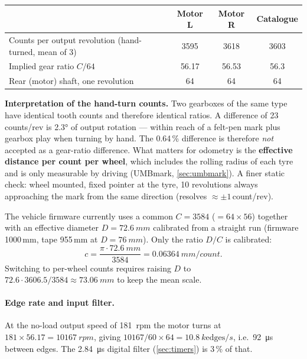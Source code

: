 \documentclass[11pt,a4paper]{article}
\begin{document}
\begin{center}
\small
\begin{tabular}{@{}lccc@{}}
\toprule
& \textbf{Motor L} & \textbf{Motor R} & \textbf{Catalogue}\\
\midrule
Counts per output revolution (hand-turned, mean of 3) & 3595 & 3618 & 3603\\
Implied gear ratio $C/64$ & 56.17 & 56.53 & 56.3\\
Rear (motor) shaft, one revolution & 64 & 64 & 64\\
\bottomrule
\end{tabular}
\end{center}

\begin{warnbox}
\textbf{Interpretation of the hand-turn counts.} Two gearboxes of the same type
have identical tooth counts and therefore identical ratios. A difference of
23\,counts/rev is \ang{2.3} of output rotation --- within reach of a felt-pen
mark plus gearbox play when turning by hand. The 0.64\,\% difference is
therefore \emph{not} accepted as a gear-ratio difference. What matters for
odometry is the \textbf{effective distance per count per wheel}, which includes
the rolling radius of each tyre and is only measurable by driving
(UMBmark, \cref{sec:umbmark}). A finer static check: wheel mounted, fixed pointer
at the tyre, 10 revolutions always approaching the mark from the same direction
(resolves $\approx\pm1$\,count/rev).
\end{warnbox}

The vehicle firmware currently uses a common $C=3584$ ($=64\times56$) together
with an effective diameter $D=\qty{72.6}{mm}$ calibrated from a straight run
(firmware 1000\,mm, tape 955\,mm at $D=\qty{76}{mm}$). Only the ratio $D/C$ is
calibrated:
\begin{equation}
c=\frac{\pi\cdot\qty{72.6}{mm}}{3584}=\qty{0.06364}{mm/count}.
\end{equation}
Switching to per-wheel counts requires raising $D$ to $72.6\cdot3606.5/3584
\approx\qty{73.06}{mm}$ to keep the mean scale.

\paragraph{Edge rate and input filter.} At the no-load output speed of
\qty{181}{rpm} the motor turns at $181\times56.17=\qty{10167}{rpm}$, giving
$10167/60\times64=\qty{10.8}{k\text{edges}/s}$, i.e.\ \qty{92}{\micro s} between
edges. The \qty{2.84}{\micro s} digital filter (\cref{sec:timers}) is 3\,\% of
that.
\end{document}
